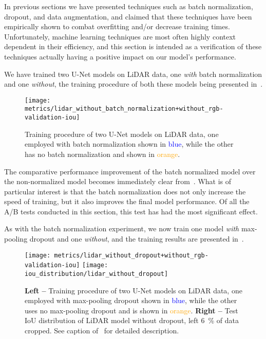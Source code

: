 In previous sections we have presented techniques such as batch normalization, dropout, and data augmentation, and claimed that these techniques have been empirically shown to combat overfitting and/or decrease training times.
Unfortunately, machine learning techniques are most often highly context dependent in their efficiency, and this section is intended as a verification of these techniques actually having a positive impact on our model's performance.


We have trained two U-Net models on LiDAR data, one \emph{with} batch normalization and one \emph{without}, the training procedure of both these models being presented in~.

\begin{figure}[H]
  \centering
  \texttt{[image: metrics/lidar\_without\_batch\_normalization+without\_rgb-validation-iou]}
  \caption{%
    Training procedure of two U-Net models on LiDAR data, one employed with batch normalization shown in \textcolor{blue}{blue}, while the other has no batch normalization and shown in \textcolor{orange}{orange}.
  }%
  \label{fig:batch-normalization-training}
\end{figure}

The comparative performance improvement of the batch normalized model over the non-normalized model becomes immediately clear from~.
What is of particular interest is that the batch normalization does not only increase the speed of training, but it also improves the final model performance.
Of all the A/B tests conducted in this section, this test has had the most significant effect.


As with the batch normalization experiment, we now train one model \emph{with} max-pooling dropout and one \emph{without}, and the training results are presented in~.

\begin{figure}[H]
  \centering
  \texttt{[image: metrics/lidar\_without\_dropout+without\_rgb-validation-iou]}
  \texttt{[image: iou\_distribution/lidar\_without\_dropout]}
  \caption{%
    \textbf{Left --} Training procedure of two U-Net models on LiDAR data, one employed with max-pooling dropout shown in \textcolor{blue}{blue}, while the other uses no max-pooling dropout and is shown in \textcolor{orange}{orange}.
    \textbf{Right --} Test IoU distribution of LiDAR model without dropout, left \SI{6}{\percent} of data cropped.
    See caption of~ for detailed description.
  }%
  \label{fig:dropout-training}
\end{figure}

